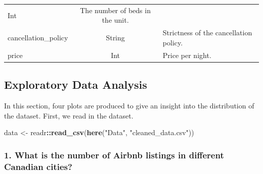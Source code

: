 \documentclass[
]{article}
\newenvironment{Shaded}{\begin{snugshade}}{\end{snugshade}}
\newcommand{\KeywordTok}[1]{\textcolor[rgb]{0.13,0.29,0.53}{\textbf{#1}}}
\newcommand{\NormalTok}[1]{#1}
\newcommand{\OperatorTok}[1]{\textcolor[rgb]{0.81,0.36,0.00}{\textbf{#1}}}
\newcommand{\StringTok}[1]{\textcolor[rgb]{0.31,0.60,0.02}{#1}}
\begin{document}
\begin{longtable}[]{@{}lcl@{}}
\begin{minipage}[t]{0.22\columnwidth}
Int\strut
\end{minipage} & \begin{minipage}[t]{0.53\columnwidth}\raggedright
The number of beds in the unit.\strut
\end{minipage}\tabularnewline
\begin{minipage}[t]{0.17\columnwidth}\raggedright
cancellation\_policy\strut
\end{minipage} & \begin{minipage}[t]{0.22\columnwidth}\centering
String\strut
\end{minipage} & \begin{minipage}[t]{0.53\columnwidth}\raggedright
Strictness of the cancellation policy.\strut
\end{minipage}\tabularnewline
\begin{minipage}[t]{0.17\columnwidth}\raggedright
price\strut
\end{minipage} & \begin{minipage}[t]{0.22\columnwidth}\centering
Int\strut
\end{minipage} & \begin{minipage}[t]{0.53\columnwidth}\raggedright
Price per night.\strut
\end{minipage}\tabularnewline
\bottomrule
\end{longtable}

\hypertarget{exploratory-data-analysis}{%
\subsection{Exploratory Data Analysis}\label{exploratory-data-analysis}}

In this section, four plots are produced to give an insight into the
distribution of the dataset. First, we read in the dataset.

\begin{Shaded}
\begin{Highlighting}[]
\NormalTok{data <-}\StringTok{ }\NormalTok{readr}\OperatorTok{::}\KeywordTok{read_csv}\NormalTok{(}\KeywordTok{here}\NormalTok{(}\StringTok{"Data"}\NormalTok{, }\StringTok{"cleaned_data.csv"}\NormalTok{))}
\end{Highlighting}
\end{Shaded}

\hypertarget{what-is-the-number-of-airbnb-listings-in-different-canadian-cities}{%
\subsubsection{1. What is the number of Airbnb listings in different
Canadian
cities?}\label{what-is-the-number-of-airbnb-listings-in-different-canadian-cities}}
\end{document}
